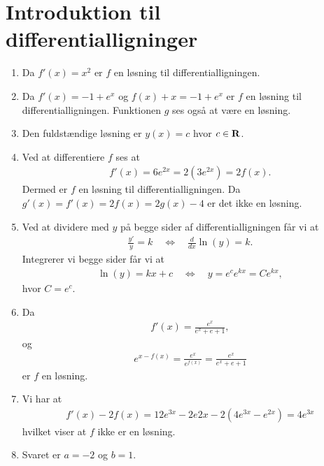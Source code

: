 \section{Introduktion til differentialligninger}
\begin{enumerate}
	\item Da $ f'(x)=x^2 $ er $f$ en løsning til differentialligningen.
	
	\item Da $f'(x)=-1+e^x$ og $f(x)+x=-1+e^x$ er $f$ en løsning til differentialligningen. Funktionen $g$ ses også at være en løsning. 
	
	
	\item Den fuldstændige løsning er $y(x)=c$ hvor $c\in \mathbf{R}$.
	
	\item Ved at differentiere $f$ ses at 
	\begin{align*}
	f'(x)=6e^{2x}=2(3e^{2x})=2f(x).
	\end{align*}
	Dermed er $f$ en løsning til differentialligningen. Da $g'(x)=f'(x)=2f(x)=2g(x)-4$ er det ikke en løsning.
	
	
	
	\item \label{it:diffeq11ans} Ved at dividere med $y$ på begge sider af differentialligningen får vi at
	\begin{align*}
	\frac{y'}{y}=k\quad\Leftrightarrow\quad \frac{d}{dx} \ln(y)=k.
	\end{align*}
	Integrerer vi begge sider får vi at
	\begin{align*}
	\ln(y)=kx+c\quad\Leftrightarrow\quad y=e^ce^{kx}=Ce^{kx},
	\end{align*}
	hvor $C=e^c$.
	
	\item Da
	\begin{align*}
	f'(x)=\frac{e^x}{e^x+e+1},
	\end{align*}
	og
	\begin{align*}
	e^{x-f(x)}=\frac{e^x}{e^{f(x)}}=\frac{e^x}{e^x+e+1}
	\end{align*}
	er $f$ en løsning.
	
	\item Vi har at
	\begin{align*}
	f'(x)-2f(x)=12e^{3x}-2e{2x}-2(4e^{3x}-e^{2x})=4e^{3x}
	\end{align*}
	hvilket viser at $f$ ikke er en løsning.
	
	\item Svaret er $a=-2$ og $b=1$.


\end{enumerate}

